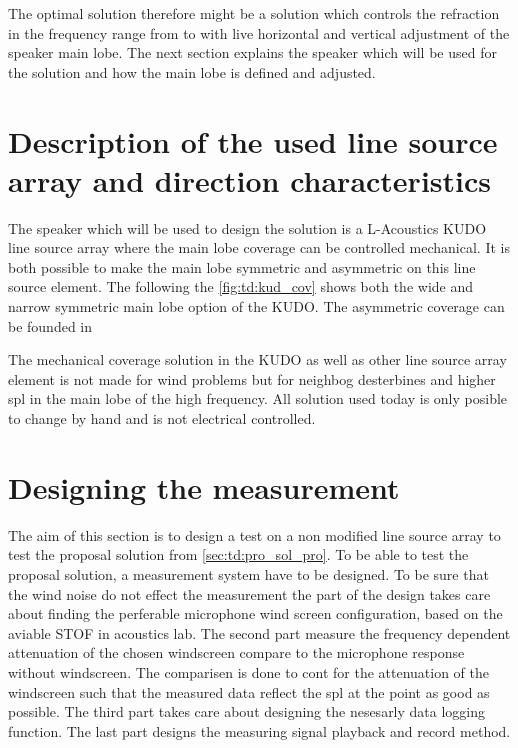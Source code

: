 
The optimal solution therefore might be a solution which controls the refraction in the frequency range from  to  with live horizontal and vertical adjustment of the speaker main lobe. The next section explains the speaker which will be used for the solution and how the main lobe is defined and adjusted.


\section{Description of the used line source array and direction characteristics}

 The speaker which will be used to design the solution is a L-Acoustics KUDO line source array where the main lobe coverage can be controlled mechanical. It is both possible to make the main lobe symmetric and asymmetric on this line source element. The following the \autoref{fig:td:kud_cov} shows both the wide and narrow symmetric main lobe option of the KUDO. The asymmetric coverage can be founded in \citep{KUDO_data}


The mechanical coverage solution in the KUDO as well as other line source array element is not made for wind problems but for neighbog desterbines and higher \gls{spl} in the main lobe of the high frequency. All solution used today is only posible to change by hand and is not electrical controlled. 





\section{Designing the measurement}

The aim of this section is to design a test on a non modified line source array to test the proposal solution from \autoref{sec:td:pro_sol_pro}. To be able to test the proposal solution, a measurement system have to be designed. To be sure that the wind noise do not effect the measurement the part of the design takes care about finding the perferable microphone wind screen configuration, based on the aviable STOF in acoustics lab. The second part measure the frequency dependent attenuation of the chosen windscreen compare to the microphone response without windscreen. The comparisen is done to cont for the attenuation of the windscreen such that the measured data reflect the \gls{spl} at the point as good as possible. The third part takes care about designing the nesesarly data logging function. The last part designs the measuring signal playback and record method.


